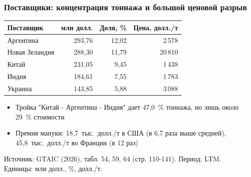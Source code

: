 \documentclass{beamer}
\begin{document}
\begin{frame}[t]
  \frametitle{Поставщики: концентрация тоннажа и большой ценовой разрыв}
  {\small
  \begin{tabular}{@{}l r r r@{}}
    \toprule
    Поставщик & млн долл. & Доля, \% & Цена, долл./т \\
    \midrule
    Аргентина & 293,76 & 12,02 & 2\,578 \\
    Новая Зеландия & 288,30 & 11,79 & 20\,810 \\
    Китай & 231,05 & 9,45 & 1\,438 \\
    Индия & 184,61 & 7,55 & 1\,783 \\
    Украина & 143,85 & 5,88 & 3\,088 \\
    \bottomrule
  \end{tabular}\par}
  \medskip
  \begin{itemize}
    \item Тройка "Китай - Аргентина - Индия" дает 47,0~\% тоннажа, но лишь около 29~\% стоимости
    \item Премия мануки: 18,7~тыс.~долл./т в США (в 6,7 раза выше средней), 45,8~тыс.~долл./т во Франции (в 12 раз)
  \end{itemize}
  \vfill
  {\scriptsize\color{srcgray} Источник: GTAIC (2026), табл. 54, 59, 64 (стр. 110-141). Период: LTM. Единицы: млн долл., \%, долл./т.\par}
\end{frame}
\end{document}
